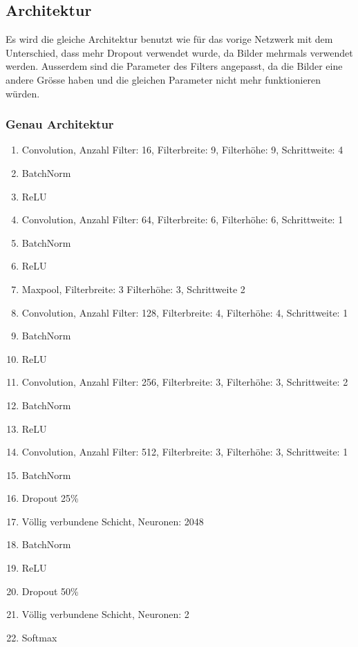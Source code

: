 \documentclass[12pt,a4paper]{report}
\begin{document}
\subsection{Architektur}
Es wird die gleiche Architektur benutzt wie für das vorige Netzwerk mit dem Unterschied,
dass mehr Dropout verwendet wurde, da Bilder mehrmals verwendet werden.
Ausserdem sind die Parameter des Filters angepasst, da die Bilder eine andere Grösse haben und die gleichen Parameter nicht mehr funktionieren würden.
\subsubsection{Genau Architektur}

\begin{enumerate}
    \setlength\itemsep{0cm}
    \setlength{\parskip}{0pt}
    \setlength{\parsep}{0pt}
    \item Convolution, Anzahl Filter: 16, Filterbreite: 9, Filterhöhe: 9, Schrittweite: 4
    \item BatchNorm
    \item ReLU
    \item Convolution, Anzahl Filter: 64, Filterbreite: 6, Filterhöhe: 6, Schrittweite: 1
    \item BatchNorm
    \item ReLU
    \item Maxpool, Filterbreite: 3 Filterhöhe: 3, Schrittweite 2
    \item Convolution, Anzahl Filter: 128, Filterbreite: 4, Filterhöhe: 4, Schrittweite: 1
    \item BatchNorm
    \item ReLU
    \item Convolution, Anzahl Filter: 256, Filterbreite: 3, Filterhöhe: 3, Schrittweite: 2
    \item BatchNorm
    \item ReLU
    \item Convolution, Anzahl Filter: 512, Filterbreite: 3, Filterhöhe: 3, Schrittweite: 1
    \item BatchNorm
    \item Dropout 25\%
    \item Völlig verbundene Schicht, Neuronen: 2048
    \item BatchNorm
    \item ReLU
    \item Dropout 50\%
    \item Völlig verbundene Schicht, Neuronen: 2
    \item Softmax
\end{enumerate}
\end{document}
